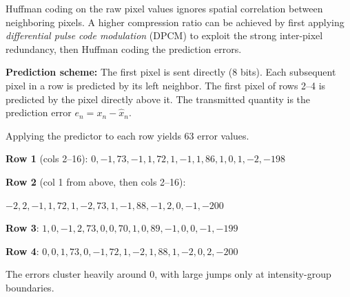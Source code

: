 \documentclass[12pt]{article}
\begin{document}
\begin{stepbox}
Huffman coding on the raw pixel values ignores spatial correlation between neighboring pixels. A higher compression ratio can be achieved by first applying \textit{differential pulse code modulation} (DPCM) to exploit the strong inter-pixel redundancy, then Huffman coding the prediction errors.

\textbf{Prediction scheme:} The first pixel is sent directly (8 bits). Each subsequent pixel in a row is predicted by its left neighbor. The first pixel of rows 2--4 is predicted by the pixel directly above it. The transmitted quantity is the prediction error $e_n = x_n - \hat{x}_n$.
\end{stepbox}

\begin{stepbox}
Applying the predictor to each row yields 63 error values.

{\small
\textbf{Row 1} (cols 2--16): $0, -1, 73, -1, 1, 72, 1, -1, 1, 86, 1, 0, 1, -2, -198$

\textbf{Row 2} (col 1 from above, then cols 2--16):

$-2, 2, -1, 1, 72, 1, -2, 73, 1, -1, 88, -1, 2, 0, -1, -200$

\textbf{Row 3}: $1, 0, -1, 2, 73, 0, 0, 70, 1, 0, 89, -1, 0, 0, -1, -199$

\textbf{Row 4}: $0, 0, 1, 73, 0, -1, 72, 1, -2, 1, 88, 1, -2, 0, 2, -200$
}

The errors cluster heavily around 0, with large jumps only at intensity-group boundaries.
\end{stepbox}
\end{document}
